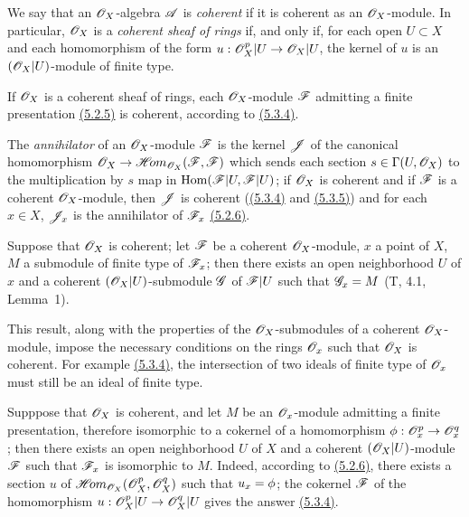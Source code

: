 \begin{env}[5.3.7]
\label{env-0.5.3.7}
We say that an $\mathscr{O}_X$-algebra $\mathscr{A}$ is {\em coherent} if it is coherent as an
$\mathscr{O}_X$-module. In particular, $\mathscr{O}_X$ is a {\em coherent sheaf of rings} if, and only if,
for each open $U\subset X$ and each homomorphism of the form $u:\mathscr{O}_X^p|U\to\mathscr{O}_X|U$, the
kernel of $u$ is an $(\mathscr{O}_X|U)$-module of finite type.

If $\mathscr{O}_X$ is a coherent sheaf of rings, each $\mathscr{O}_X$-module $\mathscr{F}$ admitting a finite
presentation \hyperref[env-0.5.2.5]{(5.2.5)} is coherent, according to \hyperref[env-0.5.3.4]{(5.3.4)}.

The {\em annihilator} of an $\mathscr{O}_X$-module $\mathscr{F}$ is the kernel $\mathscr{J}$ of the canonical
homomorphism $\mathscr{O}_X\to\mathscr{H}\!{om}_{\mathscr{O}_X}(\mathscr{F},\mathscr{F})$ which sends each section
$s\in\Gamma(U,\mathscr{O}_X)$ to the multiplication by $s$ map in ${\mathop{\mathrm{Hom}}\nolimits}(\mathscr{F}|U,\mathscr{F}|U)$; if
$\mathscr{O}_X$ is coherent and if $\mathscr{F}$ is a coherent $\mathscr{O}_X$-module, then $\mathscr{J}$ is coherent
(\hyperref[env-0.5.3.4]{(5.3.4)} and \hyperref[env-0.5.3.5]{(5.3.5)}) and for each $x\in X$, $\mathscr{J}_x$ is the
annihilator of $\mathscr{F}_x$ \hyperref[env-0.5.2.6]{(5.2.6)}.
\end{env}

\begin{env}[5.3.8]
\label{env-0.5.3.8}
Suppose that $\mathscr{O}_X$ is coherent; let $\mathscr{F}$ be a coherent $\mathscr{O}_X$-module, $x$ a point of
$X$, $M$ a submodule of finite type of $\mathscr{F}_x$; then there exists an open neighborhood $U$
of $x$ and a coherent $(\mathscr{O}_X|U)$-submodule $\mathscr{G}$ of $\mathscr{F}|U$ such that $\mathscr{G}_x=M$
(T, 4.1, Lemma~1).

This result, along with the properties of the $\mathscr{O}_X$-submodules of a coherent
$\mathscr{O}_X$-module, impose the necessary conditions on the rings $\mathscr{O}_x$ such that
$\mathscr{O}_X$ is coherent. For example \hyperref[env-0.5.3.4]{(5.3.4)}, the intersection of two
ideals of finite type of $\mathscr{O}_x$ must still be an ideal of finite type.
\end{env}

\begin{env}[5.3.9]
\label{env-0.5.3.9}
Supppose that $\mathscr{O}_X$ is coherent, and let $M$ be an $\mathscr{O}_x$-module admitting a
finite presentation, therefore isomorphic to a cokernel of a homomorphism
$\phi:\mathscr{O}_x^p\to\mathscr{O}_x^q$; then there exists an open neighborhood $U$ of $X$ and
a coherent $(\mathscr{O}_X|U)$-module $\mathscr{F}$ such that $\mathscr{F}_x$ is isomorphic to
$M$. Indeed, according to \hyperref[env-0.5.2.6]{(5.2.6)}, there exists a section $u$ of
$\mathscr{H}\!{om}_{\mathscr{O}_X}(\mathscr{O}_X^p,\mathscr{O}_X^q)$ such that $u_x=\phi$; the cokernel $\mathscr{F}$
of the homomorphism $u:\mathscr{O}_X^p|U\to\mathscr{O}_X^q|U$ gives the answer
\hyperref[env-0.5.3.4]{(5.3.4)}.
\end{env}

